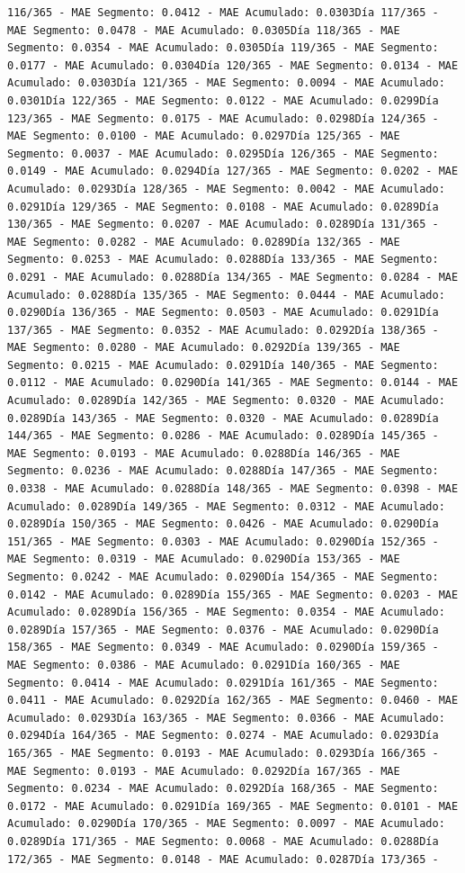 \documentclass[
]{book}
\begin{document}
\begin{verbatim}
116/365 - MAE Segmento: 0.0412 - MAE Acumulado: 0.0303Día 117/365 - MAE Segmento: 0.0478 - MAE Acumulado: 0.0305Día 118/365 - MAE Segmento: 0.0354 - MAE Acumulado: 0.0305Día 119/365 - MAE Segmento: 0.0177 - MAE Acumulado: 0.0304Día 120/365 - MAE Segmento: 0.0134 - MAE Acumulado: 0.0303Día 121/365 - MAE Segmento: 0.0094 - MAE Acumulado: 0.0301Día 122/365 - MAE Segmento: 0.0122 - MAE Acumulado: 0.0299Día 123/365 - MAE Segmento: 0.0175 - MAE Acumulado: 0.0298Día 124/365 - MAE Segmento: 0.0100 - MAE Acumulado: 0.0297Día 125/365 - MAE Segmento: 0.0037 - MAE Acumulado: 0.0295Día 126/365 - MAE Segmento: 0.0149 - MAE Acumulado: 0.0294Día 127/365 - MAE Segmento: 0.0202 - MAE Acumulado: 0.0293Día 128/365 - MAE Segmento: 0.0042 - MAE Acumulado: 0.0291Día 129/365 - MAE Segmento: 0.0108 - MAE Acumulado: 0.0289Día 130/365 - MAE Segmento: 0.0207 - MAE Acumulado: 0.0289Día 131/365 - MAE Segmento: 0.0282 - MAE Acumulado: 0.0289Día 132/365 - MAE Segmento: 0.0253 - MAE Acumulado: 0.0288Día 133/365 - MAE Segmento: 0.0291 - MAE Acumulado: 0.0288Día 134/365 - MAE Segmento: 0.0284 - MAE Acumulado: 0.0288Día 135/365 - MAE Segmento: 0.0444 - MAE Acumulado: 0.0290Día 136/365 - MAE Segmento: 0.0503 - MAE Acumulado: 0.0291Día 137/365 - MAE Segmento: 0.0352 - MAE Acumulado: 0.0292Día 138/365 - MAE Segmento: 0.0280 - MAE Acumulado: 0.0292Día 139/365 - MAE Segmento: 0.0215 - MAE Acumulado: 0.0291Día 140/365 - MAE Segmento: 0.0112 - MAE Acumulado: 0.0290Día 141/365 - MAE Segmento: 0.0144 - MAE Acumulado: 0.0289Día 142/365 - MAE Segmento: 0.0320 - MAE Acumulado: 0.0289Día 143/365 - MAE Segmento: 0.0320 - MAE Acumulado: 0.0289Día 144/365 - MAE Segmento: 0.0286 - MAE Acumulado: 0.0289Día 145/365 - MAE Segmento: 0.0193 - MAE Acumulado: 0.0288Día 146/365 - MAE Segmento: 0.0236 - MAE Acumulado: 0.0288Día 147/365 - MAE Segmento: 0.0338 - MAE Acumulado: 0.0288Día 148/365 - MAE Segmento: 0.0398 - MAE Acumulado: 0.0289Día 149/365 - MAE Segmento: 0.0312 - MAE Acumulado: 0.0289Día 150/365 - MAE Segmento: 0.0426 - MAE Acumulado: 0.0290Día 151/365 - MAE Segmento: 0.0303 - MAE Acumulado: 0.0290Día 152/365 - MAE Segmento: 0.0319 - MAE Acumulado: 0.0290Día 153/365 - MAE Segmento: 0.0242 - MAE Acumulado: 0.0290Día 154/365 - MAE Segmento: 0.0142 - MAE Acumulado: 0.0289Día 155/365 - MAE Segmento: 0.0203 - MAE Acumulado: 0.0289Día 156/365 - MAE Segmento: 0.0354 - MAE Acumulado: 0.0289Día 157/365 - MAE Segmento: 0.0376 - MAE Acumulado: 0.0290Día 158/365 - MAE Segmento: 0.0349 - MAE Acumulado: 0.0290Día 159/365 - MAE Segmento: 0.0386 - MAE Acumulado: 0.0291Día 160/365 - MAE Segmento: 0.0414 - MAE Acumulado: 0.0291Día 161/365 - MAE Segmento: 0.0411 - MAE Acumulado: 0.0292Día 162/365 - MAE Segmento: 0.0460 - MAE Acumulado: 0.0293Día 163/365 - MAE Segmento: 0.0366 - MAE Acumulado: 0.0294Día 164/365 - MAE Segmento: 0.0274 - MAE Acumulado: 0.0293Día 165/365 - MAE Segmento: 0.0193 - MAE Acumulado: 0.0293Día 166/365 - MAE Segmento: 0.0193 - MAE Acumulado: 0.0292Día 167/365 - MAE Segmento: 0.0234 - MAE Acumulado: 0.0292Día 168/365 - MAE Segmento: 0.0172 - MAE Acumulado: 0.0291Día 169/365 - MAE Segmento: 0.0101 - MAE Acumulado: 0.0290Día 170/365 - MAE Segmento: 0.0097 - MAE Acumulado: 0.0289Día 171/365 - MAE Segmento: 0.0068 - MAE Acumulado: 0.0288Día 172/365 - MAE Segmento: 0.0148 - MAE Acumulado: 0.0287Día 173/365 - 
\end{verbatim}
\end{document}

